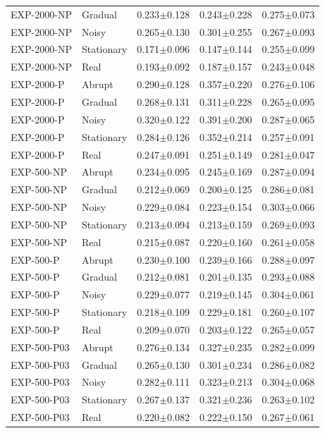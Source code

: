 \documentclass[lettersize,10pt]{article}
\begin{document}
\begin{longtable}{llccc}
EXP-2000-NP & Gradual & 0.233$\pm$0.128 & 0.243$\pm$0.228 & 0.275$\pm$0.073 \\
EXP-2000-NP & Noisy & 0.265$\pm$0.130 & 0.301$\pm$0.255 & 0.267$\pm$0.093 \\
EXP-2000-NP & Stationary & 0.171$\pm$0.096 & 0.147$\pm$0.144 & 0.255$\pm$0.099 \\
EXP-2000-NP & Real & 0.193$\pm$0.092 & 0.187$\pm$0.157 & 0.243$\pm$0.048 \\
\midrule
EXP-2000-P & Abrupt & 0.290$\pm$0.128 & 0.357$\pm$0.220 & 0.276$\pm$0.106 \\
EXP-2000-P & Gradual & 0.268$\pm$0.131 & 0.311$\pm$0.228 & 0.265$\pm$0.095 \\
EXP-2000-P & Noisy & 0.320$\pm$0.122 & 0.391$\pm$0.200 & 0.287$\pm$0.065 \\
EXP-2000-P & Stationary & 0.284$\pm$0.126 & 0.352$\pm$0.214 & 0.257$\pm$0.091 \\
EXP-2000-P & Real & 0.247$\pm$0.091 & 0.251$\pm$0.149 & 0.281$\pm$0.047 \\
\midrule
EXP-500-NP & Abrupt & 0.234$\pm$0.095 & 0.245$\pm$0.169 & 0.287$\pm$0.094 \\
EXP-500-NP & Gradual & 0.212$\pm$0.069 & 0.200$\pm$0.125 & 0.286$\pm$0.081 \\
EXP-500-NP & Noisy & 0.229$\pm$0.084 & 0.223$\pm$0.154 & 0.303$\pm$0.066 \\
EXP-500-NP & Stationary & 0.213$\pm$0.094 & 0.213$\pm$0.159 & 0.269$\pm$0.093 \\
EXP-500-NP & Real & 0.215$\pm$0.087 & 0.220$\pm$0.160 & 0.261$\pm$0.058 \\
\midrule
EXP-500-P & Abrupt & 0.230$\pm$0.100 & 0.239$\pm$0.166 & 0.288$\pm$0.097 \\
EXP-500-P & Gradual & 0.212$\pm$0.081 & 0.201$\pm$0.135 & 0.293$\pm$0.088 \\
EXP-500-P & Noisy & 0.229$\pm$0.077 & 0.219$\pm$0.145 & 0.304$\pm$0.061 \\
EXP-500-P & Stationary & 0.218$\pm$0.109 & 0.229$\pm$0.181 & 0.260$\pm$0.107 \\
EXP-500-P & Real & 0.209$\pm$0.070 & 0.203$\pm$0.122 & 0.265$\pm$0.057 \\
\midrule
EXP-500-P03 & Abrupt & 0.276$\pm$0.134 & 0.327$\pm$0.235 & 0.282$\pm$0.099 \\
EXP-500-P03 & Gradual & 0.265$\pm$0.130 & 0.301$\pm$0.234 & 0.286$\pm$0.082 \\
EXP-500-P03 & Noisy & 0.282$\pm$0.111 & 0.323$\pm$0.213 & 0.304$\pm$0.068 \\
EXP-500-P03 & Stationary & 0.267$\pm$0.137 & 0.321$\pm$0.236 & 0.263$\pm$0.102 \\
EXP-500-P03 & Real & 0.220$\pm$0.082 & 0.222$\pm$0.150 & 0.267$\pm$0.061 \\
\bottomrule
\end{longtable}
\end{document}
